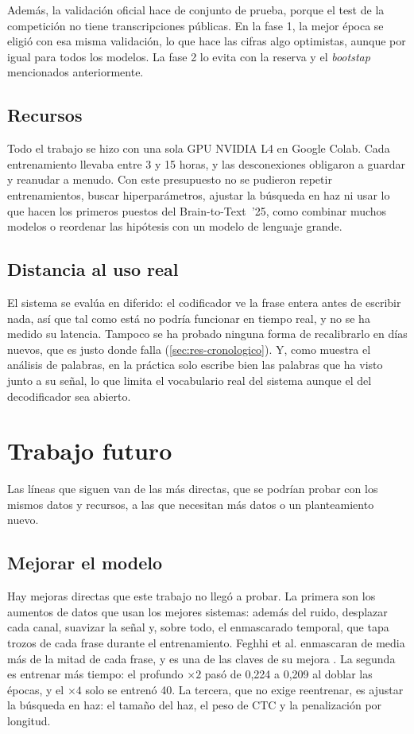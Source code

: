 Además, la validación oficial hace de conjunto de prueba, porque el test de la competición no tiene transcripciones públicas. En la fase 1, la mejor época se eligió con esa misma validación, lo que hace las cifras algo optimistas, aunque por igual para todos los modelos. La fase 2 lo evita con la reserva y el \textit{bootstap} mencionados anteriormente.

\subsection{Recursos}

Todo el trabajo se hizo con una sola GPU NVIDIA L4 en Google Colab. Cada entrenamiento llevaba entre 3 y 15 horas, y las desconexiones obligaron a guardar y reanudar a menudo. Con este presupuesto no se pudieron repetir entrenamientos, buscar hiperparámetros, ajustar la búsqueda en haz ni usar lo que hacen los primeros puestos del Brain-to-Text~'25, como combinar muchos modelos o reordenar las hipótesis con un modelo de lenguaje grande.

\subsection{Distancia al uso real}

El sistema se evalúa en diferido: el codificador ve la frase entera antes de escribir nada, así que tal como está no podría funcionar en tiempo real, y no se ha medido su latencia. Tampoco se ha probado ninguna forma de recalibrarlo en días nuevos, que es justo donde falla (\cref{sec:res-cronologico}). Y, como muestra el análisis de palabras, en la práctica solo escribe bien las palabras que ha visto junto a su señal, lo que limita el vocabulario real del sistema aunque el del decodificador sea abierto.

\section{Trabajo futuro}
\label{sec:trabajo-futuro}

Las líneas que siguen van de las más directas, que se podrían probar con los mismos datos y recursos, a las que necesitan más datos o un planteamiento nuevo.

\subsection{Mejorar el modelo}

Hay mejoras directas que este trabajo no llegó a probar. La primera son los aumentos de datos que usan los mejores sistemas: además del ruido, desplazar cada canal, suavizar la señal y, sobre todo, el enmascarado temporal, que tapa trozos de cada frase durante el entrenamiento. Feghhi et al. enmascaran de media más de la mitad de cada frase, y es una de las claves de su mejora \cite{feghhi2025timemasked}. La segunda es entrenar más tiempo: el profundo $\times 2$ pasó de 0,224 a 0,209 al doblar las épocas, y el $\times 4$ solo se entrenó 40. La tercera, que no exige reentrenar, es ajustar la búsqueda en haz: el tamaño del haz, el peso de CTC y la penalización por longitud.

